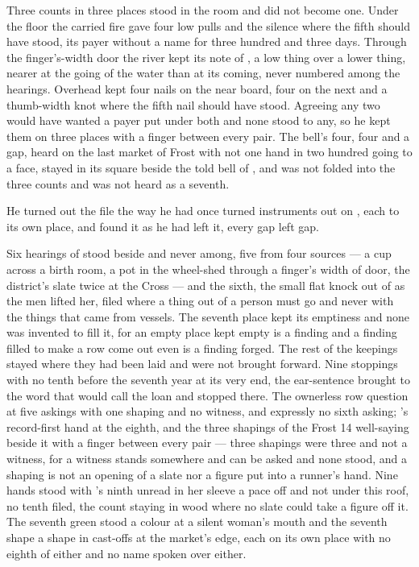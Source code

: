 Three counts in three places stood in the room and did not become one. Under the floor the carried fire gave four low pulls and the silence where the fifth should have stood, its payer without a name for three hundred and three days. Through the finger's-width door the river kept its note of , a low thing over a lower thing, nearer at the going of the water than at its coming, never numbered among the hearings. Overhead  kept four nails on the near board, four on the next and a thumb-width knot where the fifth nail should have stood. Agreeing any two would have wanted a payer put under both and none stood to any, so he kept them on three places with a finger between every pair. The bell's four, four and a gap, heard on the last market of Frost with not one hand in two hundred going to a face, stayed in its square beside the told bell of , and was not folded into the three counts and was not heard as a seventh.

\scenebreak

He turned out the file the way he had once turned instruments out on , each to its own place, and found it as he had left it, every gap left gap.

Six hearings of  stood beside and never among, five from four sources --- a cup across a birth room, a pot in the wheel-shed through a finger's width of door, the district's slate twice at the Cross --- and the sixth, the small flat knock out of  as the men lifted her, filed where a thing out of a person must go and never with the things that came from vessels. The seventh place kept its emptiness and none was invented to fill it, for an empty place kept empty is a finding and a finding filled to make a row come out even is a finding forged. The rest of the keepings stayed where they had been laid and were not brought forward. Nine stoppings with no tenth before the seventh year at its very end, the ear-sentence brought to the word that would call the loan and stopped there. The ownerless row question at five askings with one shaping and no witness, and expressly no sixth asking; 's record-first hand at the eighth, and the three shapings of the Frost 14 well-saying beside it with a finger between every pair --- three shapings were three and not a witness, for a witness stands somewhere and can be asked and none stood, and a shaping is not an opening of a slate nor a figure put into a runner's hand. Nine hands stood with 's ninth unread in her sleeve a pace off and not under this roof, no tenth filed, the count staying in wood where no slate could take a figure off it. The seventh green stood a colour at a silent woman's mouth and the seventh shape a shape in cast-offs at the market's edge, each on its own place with no eighth of either and no name spoken over either.

